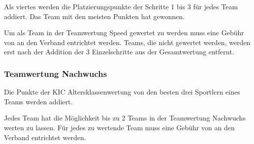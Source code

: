 Als viertes werden die Platzierungspunkte der Schritte 1 bis 3 für jedes Team addiert. Das Team mit den meisten Punkten hat gewonnen.

Um als Team in der Teamwertung Speed gewertet zu werden muss eine Gebühr von  an den Verband entrichtet werden. Teams, die nicht gewertet werden, werden erst nach der Addition der 3 Einzelschritte aus der Gesamtwertung entfernt.

\subsubsection{Teamwertung Nachwuchs}
\label{subsec:teamwertung-nachwuchs}
Die Punkte der KIC Altersklassenwertung von den besten drei Sportlern eines Teams werden addiert. 

Jedes Team hat die Möglichkeit bis zu 2 Teams in der Teamwertung Nachwuchs werten zu lassen. Für jedes zu wertende Team muss eine Gebühr von  an den Verband entrichtet werden.

